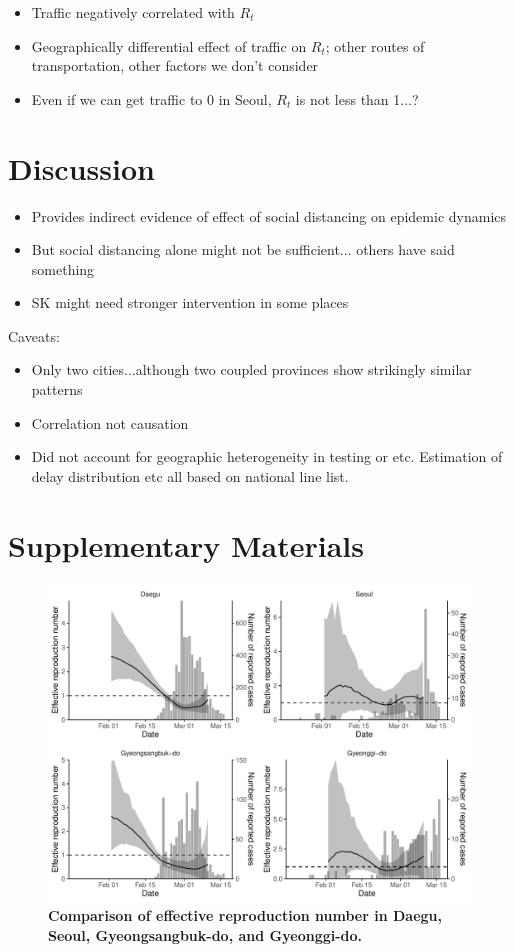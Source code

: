 \documentclass[12pt]{article}
\begin{document}
\begin{itemize}
  \item Traffic negatively correlated with $R_t$
  \item Geographically differential effect of traffic on $R_t$; other routes of transportation, other factors we don't consider
  \item Even if we can get traffic to 0 in Seoul, $R_t$ is not less than 1...?
\end{itemize}

\section{Discussion}

\begin{itemize}
  \item Provides indirect evidence of effect of social distancing on epidemic dynamics
  \item But social distancing alone might not be sufficient... others have said something
  \item SK might need stronger intervention in some places
\end{itemize}

Caveats:
\begin{itemize}
  \item Only two cities...although two coupled provinces show strikingly similar patterns
  \item Correlation not causation
  \item Did not account for geographic heterogeneity in testing or etc. Estimation of delay distribution etc all based on national line list.
\end{itemize}

\pagebreak



\section{Supplementary Materials}

\begin{figure}[!ht]
\includegraphics[width=\textwidth]{figure_R_t_all.pdf}
\caption{
\textbf{Comparison of effective reproduction number in Daegu, Seoul, Gyeongsangbuk-do, and Gyeonggi-do.}
}
\end{figure}
\end{document}
